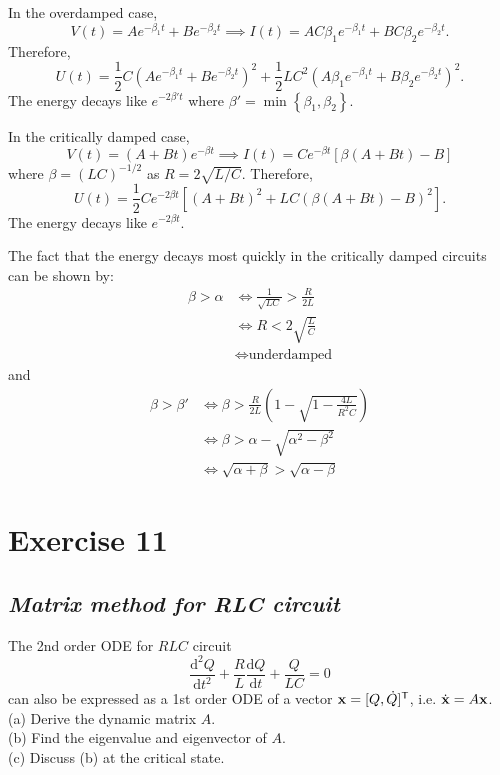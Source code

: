 \documentclass[hidelinks]{article}
\begin{document}
In the overdamped case,
$$V(t) = Ae^{-\beta_1t} +Be^{-\beta_2t} \implies I(t) =  AC\beta_1e^{-\beta_1t} + BC\beta_2e^{-\beta_2t}.$$
Therefore,
$$U(t) = \frac{1}{2}C\left(Ae^{-\beta_1t} +Be^{-\beta_2t}\right)^2+\frac{1}{2}LC^2\left(A\beta_1e^{-\beta_1t} + B\beta_2e^{-\beta_2t}\right)^2.$$
The energy decays like $e^{-2\beta' t}$ where $\beta' = \min\left\{\beta_1, \beta_2\right\}$.

In the critically damped case,
$$V(t)=\left(A + Bt\right )e^{-\beta t} \implies I(t) = Ce^{-\beta t}\left[\beta (A + Bt)-B\right]$$
where $\beta = (LC)^{-1/2}$ as $R = 2 \sqrt{L/C}$. Therefore,
$$U(t) = \frac{1}{2}Ce^{-2\beta t}\left[(A+Bt)^2+LC\left(\beta \left(A + Bt\right)-B\right)^2\right].$$
The energy decays like $e^{-2\beta t}$.

The fact that the energy decays most quickly in the critically damped circuits can be shown by:
\begin{align*}
    \beta > \alpha & \iff \frac{1}{\sqrt{LC}} > \frac{R}{2L} \\
    & \iff R<2\sqrt{\frac{L}{C}} \\ 
    & \iff \text{underdamped}
\end{align*}
and
\begin{align*}
    \beta > \beta' & \iff \beta > \frac{R}{2L}\left(1-\sqrt{1-\frac{4L}{R^2C}}\right)\\
    & \iff \beta > \alpha - \sqrt{\alpha^2 - \beta^2} \\
    & \iff \sqrt{\alpha + \beta } > \sqrt{\alpha - \beta}
\end{align*}

\pagebreak

\section{Exercise 11} 
\subsection{\textit{Matrix method for RLC circuit}}
The 2nd order ODE for $RLC$ circuit 
$$\frac{\mathrm{d}^2Q}{\mathrm{d}t^2}+ \frac{R}{L} \frac{\mathrm{d}Q}{\mathrm{d}t}+ \frac{Q}{LC}=0$$
can also be expressed as a 1st order ODE of a vector $\vb{x}=[Q,\dot{Q}]^{\mathsf{T}}$, i.e. $\dot{\vb{x}} = A\vb{x}$. \\[3mm]
(a) Derive the dynamic matrix $A$.\\
(b) Find the eigenvalue and eigenvector of $A$.\\
(c) Discuss (b) at the critical state.
\end{document}
